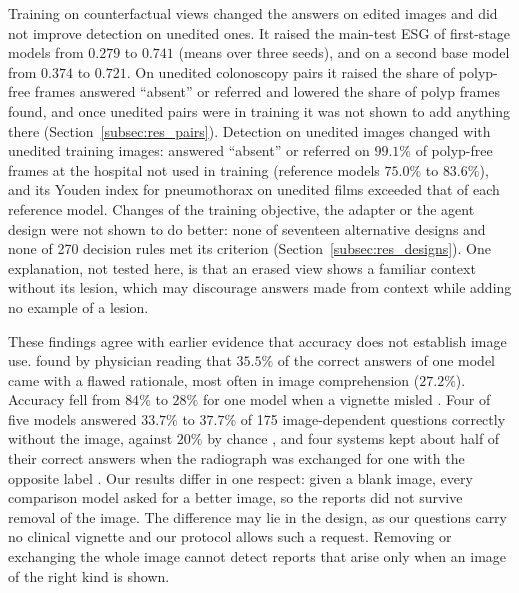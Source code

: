 Training on counterfactual views changed the answers on edited images and did not improve detection on unedited ones. It raised the main-test ESG of first-stage models from $0.279$ to $0.741$ (means over three seeds), and on a second base model from $0.374$ to $0.721$. On unedited colonoscopy pairs it raised the share of polyp-free frames answered ``absent'' or referred and lowered the share of polyp frames found, and once unedited pairs were in training it was not shown to add anything there (Section~\ref{subsec:res_pairs}). Detection on unedited images changed with unedited training images: \msn{} answered ``absent'' or referred on $99.1\%$ of polyp-free frames at the hospital not used in training (reference models $75.0\%$ to $83.6\%$), and its Youden index for pneumothorax on unedited films exceeded that of each reference model. Changes of the training objective, the adapter or the agent design were not shown to do better: none of seventeen alternative designs and none of 270 decision rules met its criterion (Section~\ref{subsec:res_designs}). One explanation, not tested here, is that an erased view shows a familiar context without its lesion, which may discourage answers made from context while adding no example of a lesion.

These findings agree with earlier evidence that accuracy does not establish image use. \citet{jin2024hidden} found by physician reading that $35.5\%$ of the correct answers of one model came with a flawed rationale, most often in image comprehension ($27.2\%$). Accuracy fell from $84\%$ to $28\%$ for one model when a vignette misled \citep{buckley2026text}. Four of five models answered $33.7\%$ to $37.7\%$ of 175 image-dependent questions correctly without the image, against $20\%$ by chance \citep{gu2025illusion}, and four systems kept about half of their correct answers when the radiograph was exchanged for one with the opposite label \citep{lotfinia2026image}. Our results differ in one respect: given a blank image, every comparison model asked for a better image, so the reports did not survive removal of the image. The difference may lie in the design, as our questions carry no clinical vignette and our protocol allows such a request. Removing or exchanging the whole image cannot detect reports that arise only when an image of the right kind is shown.

